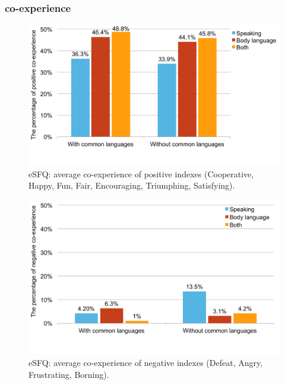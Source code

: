 



\subsubsection{co-experience}

\begin{figure}[!h]
\centering
\includegraphics[width=0.8\columnwidth]{Figures/US_eSFQ_Pos_Average.pdf}
\caption{eSFQ: average co-experience of positive indexes (Cooperative, Happy, Fun, Fair, Encouraging, Triumphing, Satisfying).}
\label{fig:US_eSFQ_Pos_Average}
\end{figure}

\begin{figure}[!h]
\centering
\includegraphics[width=0.8\columnwidth]{Figures/US_eSFQ_Neg_Average.pdf}
\caption{eSFQ: average co-experience of negative indexes (Defeat, Angry, Frustrating, Borning).}
\label{fig:US_eSFQ_Neg_Average}
\end{figure}

